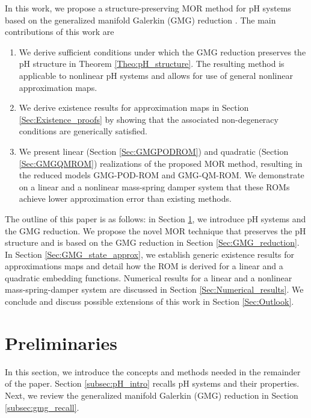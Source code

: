 \documentclass{article}
\newcommand{\pH}{\textsf{pH}\xspace}
\newcommand{\GMG}{\textsf{GMG}\xspace}
\newcommand{\QM}{\textsf{QM}\xspace} %
\newcommand{\POD}{\textsf{POD}\xspace}
\newcommand{\ROM}{\textsf{ROM}\xspace}
\newcommand{\ROMs}{\textsf{ROM}s\xspace}
\newcommand{\MOR}{\textsf{MOR}\xspace}
\begin{document}
		In this work, we propose a structure-preserving \MOR method for \pH systems based on the generalized manifold Galerkin (\GMG) reduction \cite{buchfink2024model}. The main contributions of this work are
\begin{enumerate}
	\item[(i)] We derive sufficient conditions under which the \GMG reduction preserves the \pH structure in Theorem \ref{Theo:pH_structure}. The resulting method is applicable to nonlinear \pH systems and allows for use of general nonlinear approximation maps. 
	\item [(ii)] We derive existence results for approximation maps in Section \ref{Sec:Existence_proofs} by showing that the associated non-degeneracy conditions are generically satisfied. 
	\item[(iii)] We present linear (Section \ref{Sec:GMGPODROM}) and quadratic (Section \ref{Sec:GMGQMROM}) realizations of the proposed \MOR method, resulting in the reduced models  \GMG-\POD-\ROM and \GMG-\QM-\ROM. We demonstrate on a linear and a nonlinear mass-spring damper system that these \ROMs achieve lower approximation error than existing methods. 
\end{enumerate}


The outline of this paper is as follows: in Section \ref{Sec:Prelim}, we introduce \pH systems and the \GMG reduction. We propose the novel \MOR technique that preserves the \pH structure and is based on the \GMG reduction in Section \ref{Sec:GMG_reduction}.
	In Section \ref{Sec:GMG_state_approx}, we establish generic existence results for approximations maps and detail how the \ROM is derived for a linear and a quadratic embedding functions. Numerical results for a linear and a nonlinear mass-spring-damper system are discussed in Section \ref{Sec:Numerical_results}. 
	We conclude and discuss possible extensions of this work in Section \ref{Sec:Outlook}. 


	\section{Preliminaries} \label{Sec:Prelim}
	
	In this section, we introduce the concepts and methods needed in the remainder of the paper. Section \ref{subsec:pH_intro} recalls \pH systems and their properties. 
	Next, we review the generalized manifold Galerkin (\GMG) reduction in Section \ref{subsec:gmg_recall}. 
		
\end{document}
